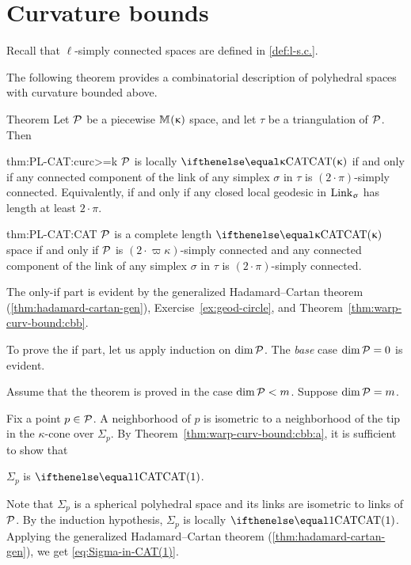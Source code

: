 \section{Curvature bounds}


Recall that $\ell$-simply connected spaces are defined in \ref{def:l-s.c.}.

The following theorem provides a combinatorial description of polyhedral spaces with curvature bounded above.


\begin{thm}{Theorem}\label{thm:PL-CAT}
Let $\mathcal{P}$ be a piecewise
$\mathbb{M}_{{}}^{}({\upkappa})$ space, and let $\tau$ be a triangulation of $\mathcal{P}$. Then 

\begin{subthm}{thm:PL-CAT:curc>=k}
$\mathcal{P}$  is locally $\CAT\kappa$
if and only if any connected component of the link of any simplex $\sigma$ in $\tau$
is $(2\cdot\pi)$-simply connected.
Equivalently, if and only if any closed local geodesic in $\mathop{\rm Link}\nolimits_\upsigma$ has length at least $2\cdot\pi$.
\end{subthm}

\begin{subthm}{thm:PL-CAT:CAT}
$\mathcal{P}$ is a complete length $\CAT\kappa$ space
if and only if $\mathcal{P}$ is $(2\cdot\varpi\kappa)$-simply connected and any connected component of the link of any simplex $\sigma$ in $\tau$
is $(2\cdot\pi)$-simply connected.
\end{subthm}

\end{thm}


The only-if part is evident by 
the generalized Hadamard--Cartan theorem (\ref{thm:hadamard-cartan-gen}), 
Exercise~\ref{ex:geod-circle}, and
Theorem~\ref{thm:warp-curv-bound:cbb}.

To prove the if part,
let us apply induction on $\mathop{\rm dim}\nolimits\mathcal{P}$.
The  {}\emph{base}  case $\mathop{\rm dim}\nolimits\mathcal{P}=0$ is evident.

Assume that the theorem is proved in the case $\dim\spc{P}\z<m$. Suppose  $\mathop{\rm dim}\nolimits\mathcal{P}=m$.

Fix a point $p\in\spc{P}$.
A neighborhood of $p$ 
is isometric to a neighborhood of the tip in the $\kappa$-cone over 
 $\Sigma_p$.
By Theorem~\ref{thm:warp-curv-bound:cbb:a}, 
it is sufficient to show that 
\begin{clm}{}\label{eq:Sigma-in-CAT(1)}
 $\Sigma_p$ is $\CAT1$.
\end{clm}

Note that $\Sigma_p$ is a spherical polyhedral space 
and its  links are isometric to  links of $\mathcal{P}$. 
By the  induction hypothesis, $\Sigma_p$ is locally $\CAT1$.
Applying the generalized Hadamard--Cartan theorem (\ref{thm:hadamard-cartan-gen}),
we get \ref{eq:Sigma-in-CAT(1)}.

